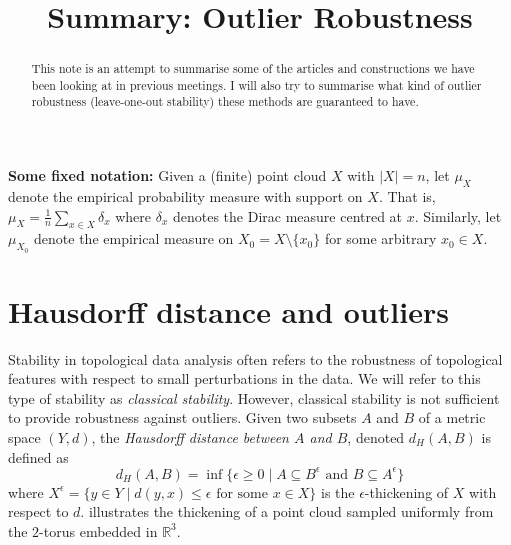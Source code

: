\documentclass[10pt,a4paper]{article}
\title{Summary: Outlier Robustness}
\theoremstyle{definition}
\newcommand{\R}{\mathbb{R}}
\begin{document}
\maketitle


\begin{abstract}
	This note is an attempt to summarise some of the articles and constructions we have been looking at in previous meetings. I will also try to summarise what kind of outlier robustness (leave-one-out stability) these methods are guaranteed to have.
\end{abstract}

\textbf{Some fixed notation:} Given a (finite) point cloud $X$ with $|X|=n$, let $\mu_X$ denote the empirical probability measure with support on $X$. That is, $\mu_X = \frac{1}{n}\sum_{x\in X}\delta_x$ where $\delta_x$ denotes the Dirac measure centred at $x$. Similarly, let $\mu_{X_0}$ denote the empirical measure on $X_0 = X\setminus\{x_0\}$ for some arbitrary $x_0\in X$. 


\section{Hausdorff distance and outliers}
Stability in topological data analysis often refers to the robustness of topological features with respect to small perturbations in the data. We will refer to this type of stability as \textit{classical stability}. However, classical stability is not sufficient to provide robustness against outliers. Given two subsets $A$ and $B$ of a metric space $(Y,d)$, the \textit{Hausdorff distance between $A$ and $B$}, denoted $d_H(A,B)$ is defined as
$$
d_H(A,B) = \inf\{\epsilon\geq0\mid A\subseteq B^\epsilon\text{ and }B\subseteq A^\epsilon\}
$$
where $X^\epsilon = \{y\in Y\mid d(y,x)\leq\epsilon\text{ for some }x\in X\}$ is the $\epsilon$-thickening of $X$ with respect to $d$.  illustrates the thickening of a point cloud sampled uniformly from the $2$-torus embedded in $\R^3$.
\end{document}
